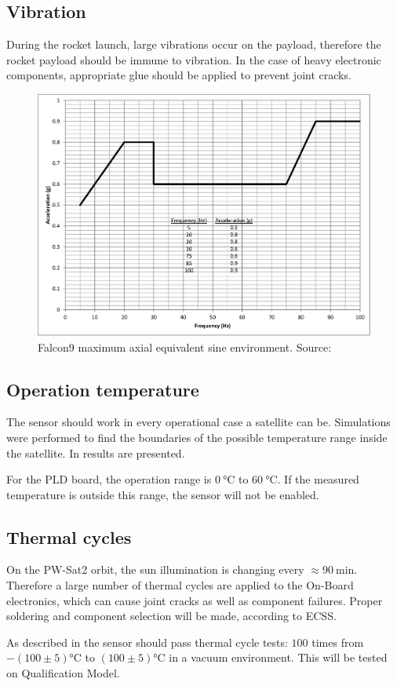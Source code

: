     \subsection{Vibration}
        During the rocket launch, large vibrations occur on the payload, therefore the rocket payload should be immune to vibration. In the case of heavy electronic components, appropriate glue should be applied to prevent joint cracks.
        \begin{figure}[H]
            \centering
            \includegraphics[width=0.5\paperwidth]{img/04/Falcon9_vibration.eps}
            \caption{Falcon9 maximum axial equivalent sine environment. Source: \cite{Falcon9_user_manual}}
            \label{Falcon9_vibration}
        \end{figure}


    \subsection{Operation temperature}
        The sensor should work in every operational case a satellite can be. Simulations were performed to find the boundaries of the  possible temperature range inside the satellite.    In \cite{PWSAT_TCS_CDR} results are presented.

        For the PLD board, the operation range is $\SI{0}{\degreeCelsius}$ to $\SI{60}{\degreeCelsius}$. If the measured temperature is outside this range, the sensor will not be enabled.


    \subsection{Thermal cycles}
        On the PW-Sat2 orbit, the sun illumination is changing every $\approx \SI{90}{\minute}$. Therefore a large number of thermal cycles are applied to the On-Board electronics, which can cause joint cracks as well as component failures. Proper soldering and component selection will be made, according to ECSS.

        As described in \cite{ECSS_Q_ST_70_04C} the sensor should pass thermal cycle tests: $100$ times from $- (100 \pm 5)$\si{\degreeCelsius} to $(100 \pm 5)$\si{\degreeCelsius} in a vacuum environment. This will be tested on Qualification Model.
